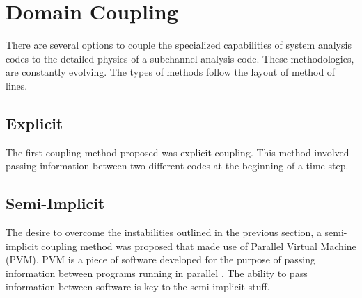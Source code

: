 \section{Domain Coupling}
\label{sect:code_coupling}
There are several options to couple the specialized capabilities of system analysis codes to the detailed physics of a subchannel analysis code.
These methodologies, are constantly evolving.
The types of methods follow the layout of method of lines.

\subsection{Explicit}
\label{subsect:coupling_explicit}
The first coupling method proposed was explicit coupling.
This method involved passing information between two different codes at the beginning of a time-step.


\subsection{Semi-Implicit}
\label{subsect:coupling_semi_implicit}
The desire to overcome the instabilities outlined in the previous section, a semi-implicit coupling method was proposed that made use of Parallel Virtual Machine (PVM).
PVM is a piece of software developed for the purpose of passing information between programs running in parallel \cite{Geist1994}. 
The ability to pass information between software is key to the semi-implicit stuff. 

